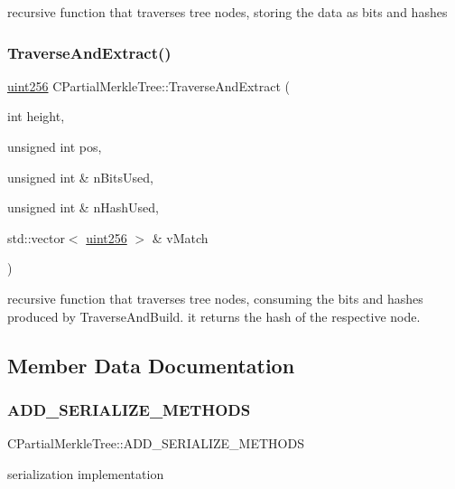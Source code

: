 recursive function that traverses tree nodes, storing the data as bits and hashes \mbox{\label{class_c_partial_merkle_tree_a3ddbe75a92d93059c30f6e60bacc7054}} 
\subsubsection{\texorpdfstring{TraverseAndExtract()}{TraverseAndExtract()}}
{\footnotesize\ttfamily \mbox{\hyperlink{classuint256}{uint256}} C\+Partial\+Merkle\+Tree\+::\+Traverse\+And\+Extract (\begin{DoxyParamCaption}\item[{int}]{height,  }\item[{unsigned int}]{pos,  }\item[{unsigned int \&}]{n\+Bits\+Used,  }\item[{unsigned int \&}]{n\+Hash\+Used,  }\item[{std\+::vector$<$ \mbox{\hyperlink{classuint256}{uint256}} $>$ \&}]{v\+Match }\end{DoxyParamCaption})\hspace{0.3cm}{\ttfamily [protected]}}

recursive function that traverses tree nodes, consuming the bits and hashes produced by Traverse\+And\+Build. it returns the hash of the respective node. 

\subsection{Member Data Documentation}
\mbox{\label{class_c_partial_merkle_tree_ae218db8103edb6672fe0d642535c7490}} 
\subsubsection{\texorpdfstring{ADD\_SERIALIZE\_METHODS}{ADD\_SERIALIZE\_METHODS}}
{\footnotesize\ttfamily C\+Partial\+Merkle\+Tree\+::\+A\+D\+D\+\_\+\+S\+E\+R\+I\+A\+L\+I\+Z\+E\+\_\+\+M\+E\+T\+H\+O\+DS}

serialization implementation \mbox{\label{class_c_partial_merkle_tree_a24bb0d9d17d6001dcfbca4d550c64ba3}} 

